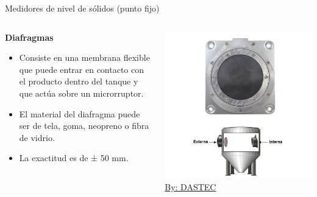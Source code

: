 \documentclass[aspectratio=169]{beamer}
\begin{document}
\begin{frame}{Medidores de nivel de sólidos (punto fijo)}
    \begin{columns}[c, onlytextwidth]
        \begin{column}{0.45\textwidth}
        \textbf{Diafragmas}
            \begin{itemize}
                \item Consiste en una membrana flexible que puede entrar en contacto con el producto dentro del tanque y que actúa sobre un microrruptor.
                \item El material del diafragma puede ser de tela, goma, neopreno o fibra de vidrio. 
                \item La exactitud es de ± 50 mm.
            \end{itemize}
        \end{column}
        \begin{column}{0.50\textwidth}
        \centering
            \includegraphics[width = 0.8\linewidth]{fig/Nivel/solido_diafragma.jpg}\\
            \tiny{\href{https://www.dastecsrl.com.ar/productos/nivel/nivel-puntual/diafragma/bm45-interruptor-de-diafragma-estandar-para-materiales-secos-de-flujo-libre-no-peligrosos}{By: DASTEC}}
        \end{column}
    \end{columns}
\end{frame}
\end{document}

